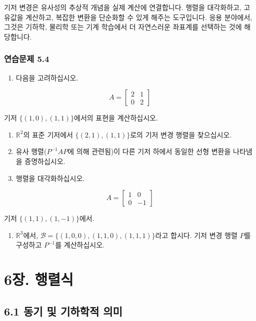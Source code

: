 \documentclass[
  12pt,
  a4paper,
]{article}
\let\oldsection\section
\renewcommand{\section}{\clearpage\oldsection}
\begin{document}
기저 변경은 유사성의 추상적 개념을 실제 계산에 연결합니다. 행렬을 대각화하고, 고유값을 계산하고, 복잡한 변환을 단순화할 수 있게 해주는 도구입니다. 응용 분야에서, 그것은 기하학, 물리학 또는 기계 학습에서 더 자연스러운 좌표계를 선택하는 것에 해당합니다.

\subsubsection{연습문제 5.4}\label{exercises-54}

\begin{enumerate}
\def\labelenumi{\arabic{enumi}.}
\item
  다음을 고려하십시오.
\end{enumerate}

\[A = \begin{bmatrix} 2 & 1 \\ 0 & 2 \end{bmatrix}\]

기저 \(\{(1,0),(1,1)\}\)에서의 표현을 계산하십시오.

\begin{enumerate}
\def\labelenumi{\arabic{enumi}.}
\item
  \(\mathbb{R}^2\)의 표준 기저에서 \(\{(2,1),(1,1)\}\)로의 기저 변경 행렬을 찾으십시오.
\item
  유사 행렬(\(P^{-1}AP\)에 의해 관련됨)이 다른 기저 하에서 동일한 선형 변환을 나타냄을 증명하십시오.
\item
  행렬을 대각화하십시오.
\end{enumerate}

\[A = \begin{bmatrix} 1 & 0 \\ 0 & -1 \end{bmatrix}\]

기저 \(\{(1,1),(1,-1)\}\)에서.

\begin{enumerate}
\def\labelenumi{\arabic{enumi}.}
\item
  \(\mathbb{R}^3\)에서, \(\mathcal{B} = \{(1,0,0),(1,1,0),(1,1,1)\}\)라고 합시다. 기저 변경 행렬 \(P\)를 구성하고 \(P^{-1}\)를 계산하십시오.
\end{enumerate}

\section{6장. 행렬식}\label{chapter-6-determinants}

\subsection{6.1 동기 및 기하학적 의미}\label{61-motivation-and-geometric-meaning}
\end{document}

